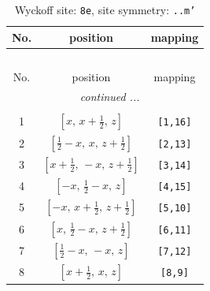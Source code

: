 \documentclass[fleqn,8pt]{jsarticle}
\begin{document}
\renewcommand{\arraystretch}{1.2}
\begin{longtable}{ccc}
\caption{Wyckoff site: {\tt 8e}, site symmetry: {\tt ..m'}}
 \\
 \hline \hline
No. & position & mapping \\ \hline \endfirsthead

\multicolumn{2}{l}{\tablename\ \thetable{}} \\
 \hline \hline
No. & position & mapping \\ \hline \endhead

 \hline \hline
\multicolumn{2}{r}{\footnotesize\it continued ...} \\ \endfoot

 \hline \hline
\multicolumn{2}{r}{} \\ \endlastfoot

1 & $\left[ x,\, x + \frac{1}{2},\, z \right]$ & {\tt [1,16]} \\ \hline
2 & $\left[ \frac{1}{2} - x,\, x,\, z + \frac{1}{2} \right]$ & {\tt [2,13]} \\ \hline
3 & $\left[ x + \frac{1}{2},\, - x,\, z + \frac{1}{2} \right]$ & {\tt [3,14]} \\ \hline
4 & $\left[ - x,\, \frac{1}{2} - x,\, z \right]$ & {\tt [4,15]} \\ \hline
5 & $\left[ - x,\, x + \frac{1}{2},\, z + \frac{1}{2} \right]$ & {\tt [5,10]} \\ \hline
6 & $\left[ x,\, \frac{1}{2} - x,\, z + \frac{1}{2} \right]$ & {\tt [6,11]} \\ \hline
7 & $\left[ \frac{1}{2} - x,\, - x,\, z \right]$ & {\tt [7,12]} \\ \hline
8 & $\left[ x + \frac{1}{2},\, x,\, z \right]$ & {\tt [8,9]} \\
\end{longtable}
\renewcommand{\arraystretch}{1.2}
\end{document}
